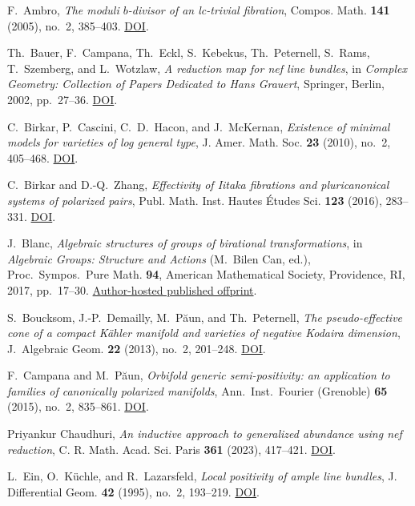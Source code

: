 
F.~Ambro,
\emph{The moduli $b$-divisor of an lc-trivial fibration},
Compos. Math. \textbf{141} (2005), no.~2, 385--403.
\href{https://doi.org/10.1112/S0010437X04001071}{DOI}.

Th.~Bauer, F.~Campana, Th.~Eckl, S.~Kebekus, Th.~Peternell,
S.~Rams, T.~Szemberg, and L.~Wotzlaw,
\emph{A reduction map for nef line bundles},
in \emph{Complex Geometry: Collection of Papers Dedicated to Hans Grauert},
Springer, Berlin, 2002, pp.~27--36.
\href{https://doi.org/10.1007/978-3-642-56202-0_2}{DOI}.

C.~Birkar, P.~Cascini, C.~D.~Hacon, and J.~McKernan,
\emph{Existence of minimal models for varieties of log general type},
J. Amer. Math. Soc. \textbf{23} (2010), no.~2, 405--468.
\href{https://doi.org/10.1090/S0894-0347-09-00649-3}{DOI}.

C.~Birkar and D.-Q.~Zhang,
\emph{Effectivity of Iitaka fibrations and pluricanonical systems of polarized pairs},
Publ. Math. Inst. Hautes \'Etudes Sci. \textbf{123} (2016), 283--331.
\href{https://doi.org/10.1007/s10240-016-0080-x}{DOI}.

J.~Blanc,
\emph{Algebraic structures of groups of birational transformations},
in \emph{Algebraic Groups: Structure and Actions} (M.~Bilen Can, ed.),
Proc.~Sympos.~Pure Math. \textbf{94}, American Mathematical Society,
Providence, RI, 2017, pp.~17--30.
\href{https://algebra.dmi.unibas.ch/blanc/articles/structurebir.pdf}{Author-hosted published offprint}.

S.~Boucksom, J.-P.~Demailly, M.~P\u{a}un, and Th.~Peternell,
\emph{The pseudo-effective cone of a compact K\"ahler manifold and varieties of negative Kodaira dimension},
J.~Algebraic Geom. \textbf{22} (2013), no.~2, 201--248.
\href{https://doi.org/10.1090/S1056-3911-2012-00574-8}{DOI}.

F.~Campana and M.~P\u{a}un,
\emph{Orbifold generic semi-positivity: an application to families of canonically polarized manifolds},
Ann.~Inst.~Fourier (Grenoble) \textbf{65} (2015), no.~2, 835--861.
\href{https://doi.org/10.5802/aif.2945}{DOI}.

Priyankur Chaudhuri,
\emph{An inductive approach to generalized abundance using nef reduction},
C. R. Math. Acad. Sci. Paris \textbf{361} (2023), 417--421.
\href{https://doi.org/10.5802/crmath.420}{DOI}.

L.~Ein, O.~K\"uchle, and R.~Lazarsfeld,
\emph{Local positivity of ample line bundles},
J. Differential Geom. \textbf{42} (1995), no.~2, 193--219.
\href{https://doi.org/10.4310/jdg/1214457231}{DOI}.


